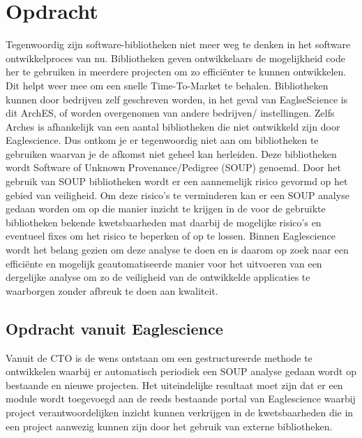 
\chapter{Opdracht} %

\label{ch:opdracht} %
Tegenwoordig zijn software-bibliotheken niet meer weg te denken in het software ontwikkelproces van nu. Bibliotheken geven ontwikkelaars de mogelijkheid code her te gebruiken in meerdere  projecten om zo effici\"enter te kunnen ontwikkelen. Dit helpt weer mee om een snelle Time-To-Market te behalen. Bibliotheken kunnen door bedrijven zelf geschreven worden, in het geval van EaglseScience is dit ArchES, of worden overgenomen van andere bedrijven/ instellingen. Zelfs Arches is afhankelijk van een aantal bibliotheken die niet ontwikkeld zijn door Eaglescience. Dus ontkom je er tegenwoordig niet aan om bibliotheken te gebruiken waarvan je de afkomst niet geheel kan herleiden. Deze bibliotheken wordt Software of Unknown Provenance/Pedigree (SOUP) genoemd. Door het gebruik van SOUP bibliotheken wordt er een aannemelijk risico gevormd op het gebied van veiligheid. Om deze risico’s te verminderen kan er een SOUP analyse gedaan worden om op die manier inzicht te krijgen in de voor de gebruikte bibliotheken bekende kwetsbaarheden mat daarbij de mogelijke risico’s en eventueel fixes om het risico te beperken of op te lossen.
Binnen Eaglescience wordt het belang gezien om deze analyse te doen en is daarom op zoek naar een efficiënte en mogelijk geautomatiseerde manier voor het uitvoeren van een dergelijke analyse om zo de veiligheid van de ontwikkelde applicaties te waarborgen zonder afbreuk te doen aan kwaliteit. 


\section{Opdracht vanuit Eaglescience}
Vanuit de CTO is de wens ontstaan om een gestructureerde methode te ontwikkelen waarbij er automatisch periodiek een SOUP analyse gedaan wordt op bestaande en nieuwe projecten. Het uiteindelijke resultaat moet zijn dat er een module wordt toegevoegd aan de reeds bestaande portal van Eaglescience waarbij project verantwoordelijken inzicht kunnen verkrijgen in de kwetsbaarheden die in een project aanwezig kunnen zijn door het gebruik van externe bibliotheken.

